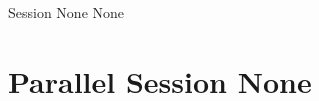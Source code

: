 \clearpage
{}
\begin{ThreeSessionOverview}{Session None}{\daydateyear}
  {None}
\end{ThreeSessionOverview}

\newpage
\section*{Parallel Session None}

